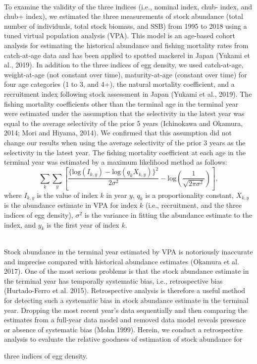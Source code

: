 \documentclass[12pt]{article}
\begin{document}
\begin{linenumbers}
{\\
To examine the validity of the three indices (i.e., nominal index, chub- index, and chub+ index), we estimated the three measurements of stock abundance (total number of individuals, total stock biomass, and SSB) from 1995 to 2018 using a tuned virtual population analysis (VPA). This model is an age-based cohort analysis for estimating the historical abundance and fishing mortality rates from catch-at-age data and has been applied to spotted mackerel in Japan (Yukami et al., 2019). In addition to the three indices of egg density, we used catch-at-age, weight-at-age (not constant over time), maturity-at-age (constant over time) for four age categories (1 to 3, and 4+), the natural mortality coefficient, and a recruitment index following stock assessment in Japan (Yukami et al., 2019). The fishing mortality coefficients other than the terminal age in the terminal year were estimated under the assumption that the selectivity in the latest year was equal to the average selectivity of the prior 5 years (Ichinokawa and Okamura, 2014; Mori and Hiyama, 2014). We confirmed that this assumption did not change our results when using the average selectivity of the prior 3 years as the selectivity in the latest year. The fishing mortality coefficient at each age in the terminal year was estimated by a maximum likelihood method as follows:
\[\sum_{k} \sum_{y} \left[ \frac{\{\mathrm{log}(I_{k,y})-\mathrm{log}(q_{k}X_{k,y})\}^2} {2\sigma^{2}} - \mathrm{log}(\frac{1} {\sqrt{2\pi\sigma^{2}}}) \right]
,\]
where $I_{k,y}$ is the value of index $k$ in year $y$, $q_{k}$ is a proportionality constant, $X_{k,y}$ is the abundance estimate in VPA for index $k$ (i.e., recruitment, and the three indices of egg density), $\sigma^2$ is the variance in fitting the abundance estimate to the index, and $y_{k}$ is the first year of index $k$.

\\
Stock abundance in the terminal year estimated by VPA is notoriously inaccurate and imprecise compared with historical abundance estimates (Okamura et al. 2017). One of the most serious problems is that the stock abundance estimate in the terminal year has temporally systematic bias, i.e., retrospective bias (Hurtado-Ferro et al. 2015). Retrospective analysis is therefore a useful method for detecting such a systematic bias in stock abundance estimate in the terminal year. Dropping the most recent year's data sequentially and then comparing the estimates from a full-year data model and removed data model reveals presence or absence of systematic bias (Mohn 1999). Herein, we conduct a retrospective analysis to evaluate the relative goodness of estimation of stock abundance for} three indices of egg density.


\end{linenumbers}
\end{document}
